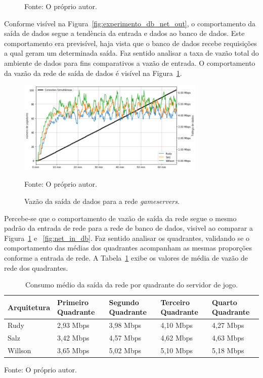 \begin{figure}[htb!]
    Fonte: O próprio autor.
\end{figure}

Conforme visível na Figura~\ref{fig:experimento_db_net_out}, o comportamento da saída de dados segue a tendència da entrada e dados ao banco de dados.
%
Este comportamento era previsível, haja vista que o banco de dados recebe requisições a qual geram um determinada saída.
%
Faz sentido analisar a taxa de vazão total do ambiente de dados para fins comparativos a vazão de entrada.
%
O comportamento da vazão da rede de saída de dados é visível na Figura~\ref{fig:net_out_db}.

\begin{figure}[htb!]
  \caption{Vazão da saída de dados para a rede \textit{gameservers}.}
  \label{fig:net_out_db}
  \includegraphics[width=0.8\textwidth]{figuras/analise/net_out_db.png}
  \centering

  Fonte: O próprio autor.
\end{figure}

Percebe-se que o comportamento de vazão de saída da rede segue o mesmo padrão da entrada de rede para a rede de banco de dados, visivel ao comparar a Figura~\ref{fig:net_out_db} e ~\ref{fig:net_in_db}.
%
Faz sentido analisar os quadrantes, validando se o comportamento das médias dos quadrantes acompanham as mesmas proporções conforme a entrada de rede.
%
A Tabela~\ref{tab:net_in_db_media_quadrantes} exibe os valores de média de vazão de rede dos quadrantes.

\begin{table}[htb!]
\centering
\begin{adjustbox}{max width=\textwidth}
\caption{Consumo médio da saída da rede por quadrante do servidor de jogo.}
\label{tab:net_in_db_media_quadrantes}

\begin{tabular}{l|l|l|l|l}
\hline \hline
Arquitetura & Primeiro Quadrante & Segundo Quadrante & Terceiro Quadrante & Quarto Quadrante \\ \hline \hline
Rudy        & 2,93 Mbps            & 3,98 Mbps           & 4,10 Mbps            & 4,27 Mbps          \\ \hline
Salz        & 3,42 Mbps            & 4,57 Mbps           & 4,62 Mbps            & 4,63 Mbps          \\ \hline
Willson     & 3,65 Mbps            & 5,02 Mbps          & 5,10 Mbps            & 5,18 Mbps          \\ \hline \hline
\end{tabular}
\end{adjustbox}

Fonte: O próprio autor.
\end{table}

